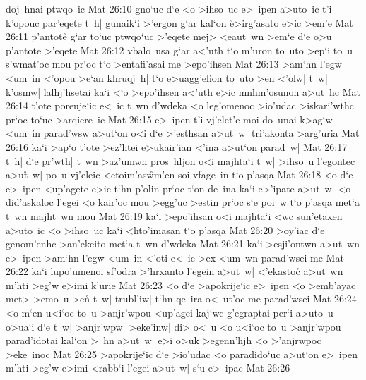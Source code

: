 doj~hnai
ptwqo~ic\bibvsend
\vs Mat 26:10
gno`uc
d`e
<o
>ihso~uc
e>~ipen
a>uto~ic
t'i
k'opouc
par'eqete
t~h|
gunaik`i
>'ergon
g`ar
kal`on
\r{e}>irg'asato
e>ic
>em'e\bibvsend
\vs Mat 26:11
p'antote\r{}
g`ar
to`uc
ptwqo`uc
>'eqete
mej>
<eaut~wn
>em`e
d`e
o>u
p'antote
>'eqete\bibvsend
\vs Mat 26:12
vbalo~usa
g`ar
a<'uth
t`o
m'uron
to~uto
>ep`i
to~u
s'wmat'oc
mou
pr`oc
t`o
>entafi'asai
me
>epo'ihsen\bibvsend
\vs Mat 26:13
>am`hn
l'egw
<um~in
<'opou
>e`an
khruqj~h|
t`o
e>uagg'elion
to~uto
>en
<'olw|
t~w|
k'osmw|
lalhj'hsetai
ka`i
<`o
>epo'ihsen
a<'uth
e>ic
mnhm'osunon
a>ut~hc\bibvsend
\vs Mat 26:14
t'ote
poreuje`ic
e<~ic
t~wn
d'wdeka
<o
leg'omenoc
>io'udac
>iskari'wthc
pr`oc
to`uc
>arqiere~ic\bibvsend
\vs Mat 26:15
e>~ipen
t'i
vj'elet'e
moi
do~unai
k>ag`w
<um~in
parad'wsw
a>ut`on
o<i
d`e
>'esthsan
a>ut~w|
tri'akonta
>arg'uria\bibvsend
\vs Mat 26:16
ka`i
>ap`o
t'ote
>ez'htei
e>ukair'ian
<'ina
a>ut`on
parad~w|\bibvsend
\vs Mat 26:17
t~h|
d`e
pr'wth|
t~wn
>az'umwn
pros~hljon
o<i
majhta`i
t~w|
>ihso~u
l'egontec
a>u\r{t}~w|
po~u
vj'eleic
<etoim'as\r{w}m'en
soi
vfage~in
t`o
p'asqa\bibvsend
\vs Mat 26:18
<o
d`e
e>~ipen
<up'agete
e>ic
t`hn
p'olin
pr`oc
t`on
de~ina
ka`i
e>'ipate
a>ut~w|
<o
did'askaloc
l'egei
<o
kair'oc
mou
>egg'uc
>estin
pr`oc
s`e
poi~w
t`o
p'asqa
met`a
t~wn
majht~wn
mou\bibvsend
\vs Mat 26:19
ka`i
>epo'ihsan
o<i
majhta`i
<wc
sun'etaxen
a>uto~ic
<o
>ihso~uc
ka`i
<hto'imasan
t`o
p'asqa\bibvsend
\vs Mat 26:20
>oy'iac
d`e
genom'enhc
>an'ekeito
met`a
t~wn
d'wdeka\bibvsend
\vs Mat 26:21
ka`i
>esji'ontwn
a>ut~wn
e>~ipen
>am`hn
l'egw
<um~in
<'oti
e<~ic
>ex
<um~wn
parad'wsei
me\bibvsend
\vs Mat 26:22
ka`i
lupo'umenoi
sf'odra
>'hrxanto
l'egein
a>ut~w|
<'ekastoc\r{}
a>ut~wn
m'hti
>eg'w
e>imi
k'urie\bibvsend
\vs Mat 26:23
<o
d`e
>apokrije`ic
e>~ipen
<o
>emb'ayac
met>
>emo~u
>en\r{}
t~w|
trubl'iw|
t`hn
qe~ira
o<~ut'oc
me
parad'wsei\bibvsend
\vs Mat 26:24
<o
m`en
u<i`oc
to~u
>anjr'wpou
<up'agei
kaj`wc
g'egraptai
per`i
a>uto~u
o>ua`i
d`e
t~w|
>anjr'wpw|
>eke'inw|
di>
o<~u
<o
u<i`oc
to~u
>anjr'wpou
parad'idotai
kal`on
>~hn
a>ut~w|
e>i
o>uk
>egenn'hjh
<o
>'anjrwpoc
>eke~inoc\bibvsend
\vs Mat 26:25
>apokrije`ic
d`e
>io'udac
<o
paradido`uc
a>ut`on
e>~ipen
m'hti
>eg'w
e>imi
<rabb`i
l'egei
a>ut~w|
s`u
e>~ipac\bibvsend
\vs Mat 26:26

